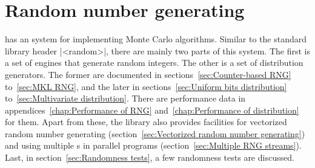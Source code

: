 %
%
%
%

\chapter{Random number generating}
\label{chap:Random number generating}

\mckl has an \rng system for implementing Monte Carlo algorithms. Similar to
the standard library header |<random>|, there are mainly two parts of this
system. The first is a set of \rng engines that generate random integers. The
other is a set of distribution generators. The former are documented in
sections~\ref{sec:Counter-based RNG} to~\ref{sec:MKL RNG}, and the later in
sections~\ref{sec:Uniform bits distribution} to~\ref{sec:Multivariate
  distribution}. There are performance data in appendices~\ref{chap:Performance
of RNG} and~\ref{chap:Performance of distribution} for them. Apart from these,
the library also provides facilities for vectorized random number generating
(section~\ref{sec:Vectorized random number generating}) and using multiple
\rng{}s in parallel programs (section~\ref{sec:Multiple RNG streams}). Last, in
section~\ref{sec:Randomness tests}, a few randomness tests are discussed.

